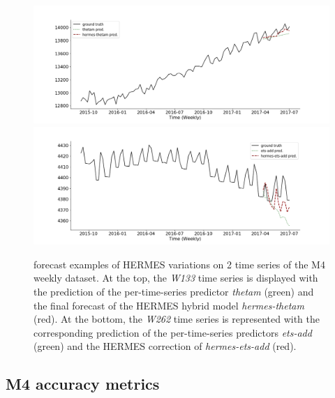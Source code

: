 \documentclass[10pt]{article} %
\begin{document}
\begin{figure}
\centering
  \includegraphics[width=1.\linewidth]{w133_hermes_prediction.png}
  \includegraphics[width=1.\linewidth]{w262_hermes_prediction.png}
\caption{forecast examples of HERMES variations on 2 time series of the M4 weekly dataset. At the top, the \textit{W133} time series is displayed with the prediction of the per-time-series predictor \textit{thetam} (green) and the final forecast of the HERMES hybrid model \textit{hermes-thetam} (red). At the bottom, the \textit{W262} time series is represented with the corresponding prediction of the per-time-series predictors \textit{ets-add} (green) and the HERMES correction of \textit{hermes-ets-add} (red).} 
\label{fig:m4pred}
\end{figure}

\subsection{M4 accuracy metrics}
\label{sec:m4metric}
\end{document}
